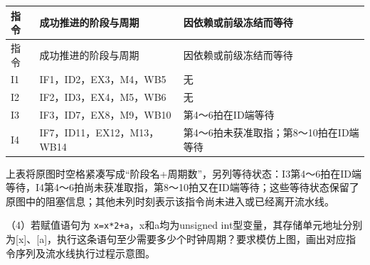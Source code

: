 \par\smallskip
{\fontsize{9.3}{12}\selectfont\setlength{\tabcolsep}{2.5pt}\setlength{\LTleft}{0pt}\setlength{\LTright}{0pt}
\begin{longtable}{@{}>{\raggedright\arraybackslash}p{}>{\raggedright\arraybackslash}p{}>{\raggedright\arraybackslash}p{}@{}}
\toprule
指令 & 成功推进的阶段与周期 & 因依赖或前级冻结而等待 \\

\midrule\endfirsthead\toprule
指令 & 成功推进的阶段与周期 & 因依赖或前级冻结而等待 \\

\midrule\endhead\bottomrule\endfoot
I1 & IF1，ID2，EX3，M4，WB5 & 无 \\

I2 & IF2，ID3，EX4，M5，WB6 & 无 \\

I3 & IF3，ID7，EX8，M9，WB10 & 第4～6拍在ID端等待 \\

I4 & IF7，ID11，EX12，M13，WB14 & 第4～6拍未获准取指；第8～10拍在ID端等待 \\

\end{longtable}}
\par\smallskip

上表将原图时空格紧凑写成``阶段名+周期数''，另列等待状态：I3第4～6拍在ID端等待，I4第4～6拍尚未获准取指，第8～10拍又在ID端等待；这些等待状态保留了原图中的阻塞信息；其他未列时刻表示该指令尚未进入或已经离开流水线。

（4）若赋值语句为 \texttt{x=\allowbreak{}x*\allowbreak{}2+\allowbreak{}a}，x和a均为unsigned int型变量，其存储单元地址分别为{[}x{]}、{[}a{]}，执行这条语句至少需要多少个时钟周期？要求模仿上图，画出对应指令序列及流水线执行过程示意图。
